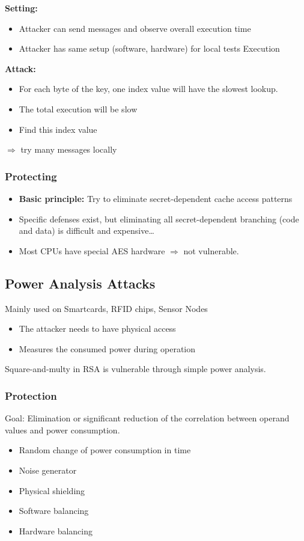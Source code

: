 \textbf{Setting:}
\begin{itemize}
  \item Attacker can send messages and observe overall execution time
  \item Attacker has same setup (software, hardware) for local tests
    Execution
\end{itemize}

\textbf{Attack:}
\begin{itemize}
  \item For each byte of the key, one index value will have the slowest lookup.
  \item The total execution will be slow
  \item Find this index value
\end{itemize}
$\Rightarrow$  try many messages locally


\subsubsection{Protecting}
\begin{itemize}
  \item \textbf{Basic principle:}
    Try to eliminate secret-dependent cache access patterns
  \item Specific defenses exist, but eliminating all secret-dependent
    branching (code and data) is difficult and expensive…
  \item Most CPUs have special AES hardware  $\Rightarrow$ not vulnerable.
\end{itemize}

\subsection{Power Analysis Attacks}
Mainly used on Smartcards, RFID chips, Sensor Nodes
\begin{itemize}
  \item The attacker needs to have physical access
  \item Measures the consumed power during  operation
\end{itemize}
Square-and-multy in RSA is vulnerable through simple power analysis.
\subsubsection{Protection}
Goal: Elimination or significant reduction of the correlation between operand
values and power consumption.
\begin{itemize}
  \item Random change of power consumption in time
  \item Noise generator
  \item Physical shielding
  \item Software balancing
  \item Hardware balancing
\end{itemize}

